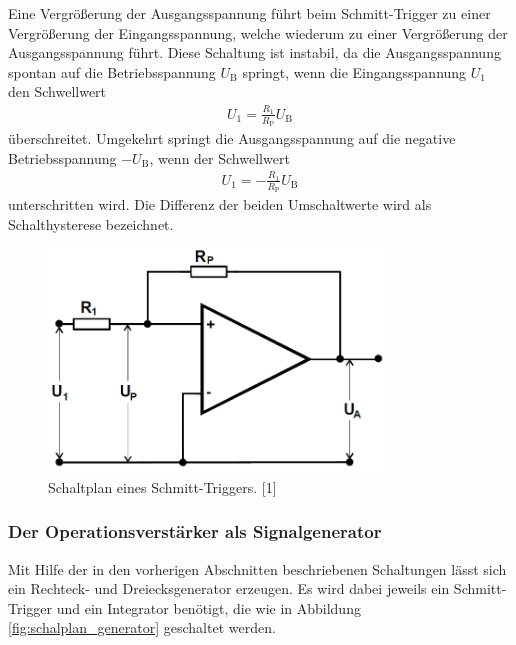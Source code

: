 \documentclass[]{scrartcl}
\begin{document}
Eine Vergrößerung der Ausgangsspannung führt beim Schmitt-Trigger zu einer Vergrößerung der Eingangsspannung, welche wiederum zu einer Vergrößerung der Ausgangsspannung führt. Diese Schaltung ist instabil, da die Ausgangsspannung spontan auf die Betriebsspannung $U_\text{B}$ springt, wenn die Eingangsspannung $U_1$ den Schwellwert
\begin{align}
U_1=\frac{R_1}{R_\text{P}}U_\text{B}
\end{align} 
überschreitet. Umgekehrt springt die Ausgangsspannung auf die negative Betriebsspannung $-U_\text{B}$, wenn der Schwellwert
\begin{align}
U_1=-\frac{R_1}{R_\text{P}}U_\text{B}
\end{align}
unterschritten wird.
Die Differenz der beiden Umschaltwerte wird als Schalthysterese bezeichnet.
\begin{figure}[H]
\centering
\includegraphics[width=9cm]{images/schaltplan_schmitt_trigger.png}
\caption{Schaltplan eines Schmitt-Triggers. [1]}
\label{fig:schalplan_schmitt_trigger}
\end{figure}


\subsubsection{Der Operationsverstärker als Signalgenerator}
Mit Hilfe der in den vorherigen Abschnitten beschriebenen Schaltungen lässt sich ein Rechteck- und Dreiecksgenerator erzeugen. 
Es wird dabei jeweils ein Schmitt-Trigger und ein Integrator benötigt, die wie in Abbildung \ref{fig:schalplan_generator} geschaltet werden.
\end{document}

